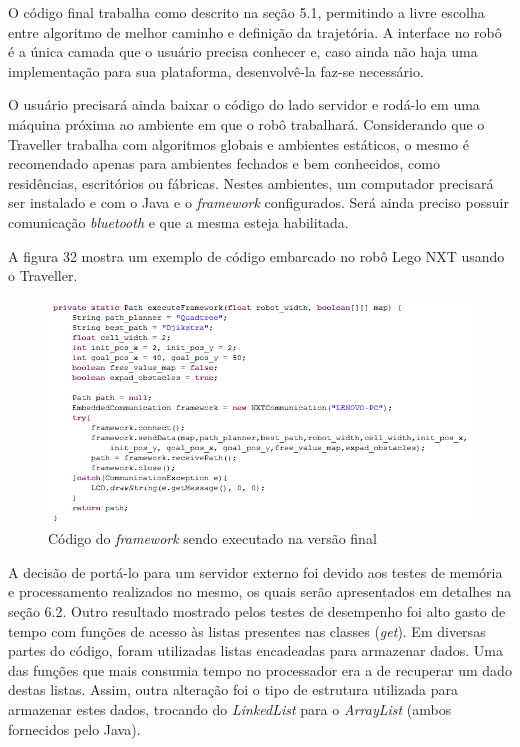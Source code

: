 O código final trabalha como descrito na seção 5.1, permitindo a livre escolha entre algoritmo de melhor caminho e definição da trajetória. A interface no robô é a única camada que o usuário precisa conhecer e, caso ainda não haja uma implementação para sua plataforma, desenvolvê-la faz-se necessário.

O usuário precisará ainda baixar o código do lado servidor e rodá-lo em uma máquina próxima ao ambiente em que o robô trabalhará. Considerando que o Traveller trabalha com algoritmos globais e ambientes estáticos, o mesmo é recomendado apenas para ambientes fechados e bem conhecidos, como residências, escritórios ou fábricas. Nestes ambientes, um computador precisará ser instalado e com o Java e o \textit{framework} configurados. Será ainda preciso possuir comunicação \textit{bluetooth} e que a mesma esteja habilitada.

A figura 32 mostra um exemplo de código embarcado no robô Lego NXT usando o Traveller.

\begin{figure}[h]
	\centering
	\label{fig32}
		\includegraphics[keepaspectratio=true,scale=0.8]{figuras/codigofinal.PNG}
	\caption{Código do \textit{framework} sendo executado na versão final}
\end{figure}

A decisão de portá-lo para um servidor externo foi devido aos testes de memória e processamento realizados no mesmo, os quais serão apresentados em detalhes na seção 6.2. Outro resultado mostrado pelos testes de desempenho foi alto gasto de tempo com funções de acesso às listas presentes nas classes (\textit{get}). Em diversas partes do código, foram utilizadas listas encadeadas para armazenar dados. Uma das funções que mais consumia tempo no processador era a de recuperar um dado destas listas. Assim, outra alteração foi o tipo de estrutura utilizada para armazenar estes dados, trocando do \textit{LinkedList} para o \textit{ArrayList} (ambos fornecidos pelo Java).

